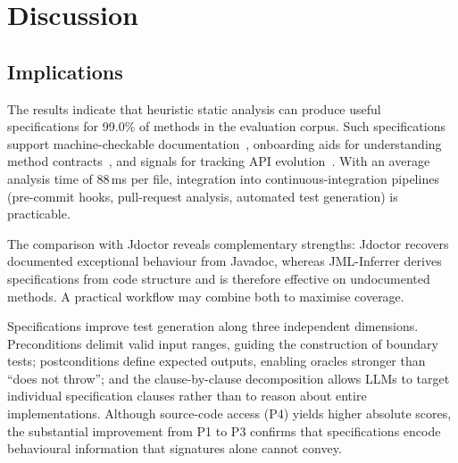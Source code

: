\section{Discussion}
\label{sec:discussion}

\subsection{Implications}

The results indicate that heuristic static analysis can produce useful specifications for 99.0\% of methods in the evaluation corpus. Such specifications support machine-checkable documentation~\cite{peters1998using}, onboarding aids for understanding method contracts~\cite{sillito2008questions}, and signals for tracking API evolution~\cite{tip2002practical}. With an average analysis time of 88\,ms per file, integration into continuous-integration pipelines (pre-commit hooks, pull-request analysis, automated test generation) is practicable.

The comparison with Jdoctor reveals complementary strengths: Jdoctor recovers documented exceptional behaviour from Javadoc, whereas JML-Inferrer derives specifications from code structure and is therefore effective on undocumented methods. A practical workflow may combine both to maximise coverage.

Specifications improve test generation along three independent dimensions. Preconditions delimit valid input ranges, guiding the construction of boundary tests; postconditions define expected outputs, enabling oracles stronger than ``does not throw''; and the clause-by-clause decomposition allows LLMs to target individual specification clauses rather than to reason about entire implementations. Although source-code access (P4) yields higher absolute scores, the substantial improvement from P1 to P3 confirms that specifications encode behavioural information that signatures alone cannot convey.

